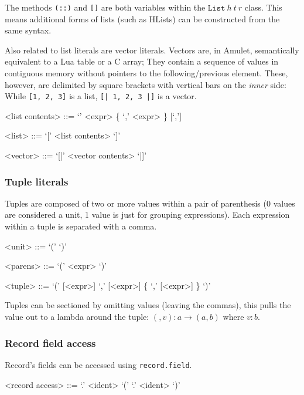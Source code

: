 The methods \texttt{(::)} and \texttt{[]} are both variables within the $\mathtt{List}\ h\ t\ r$ class. This means additional forms of lists (such as HLists) can be constructed from the same syntax.

Also related to list literals are vector literals. Vectors are, in Amulet, semantically equivalent to a Lua table or a C array; They contain a sequence of values in contiguous memory without pointers to the following/previous element. These, however, are delimited by square brackets with vertical bars on the \textit{inner} side: While \texttt{[1, 2, 3]} is a list, \texttt{[| 1, 2, 3 |]} is a vector.

\begin{grammar}
<list contents> ::= `'
               \alt <expr> \{ `,' <expr> \} [`,']

<list> ::= `[' <list contents> `]'

<vector> ::= `[|' <vector contents> `|]'
\end{grammar}

\subsubsection{Tuple literals}
Tuples are composed of two or more values within a pair of parenthesis (0 values are considered a unit, 1 value is just for grouping expressions). Each expression within a tuple is separated with a comma.

\begin{grammar}
<unit>   ::= `(' `)'

<parens> ::= `(' <expr> `)'

<tuple>  ::= `(' [<expr>] `,' [<expr>] \{ `,' [<expr>] \} `)'
\end{grammar}

Tuples can be sectioned by omitting values (leaving the commas), this pulls the value out to a lambda around the tuple: $(, v) : a \to (a, b)$ where $v : b$.

\subsubsection{Record field access}
Record's fields can be accessed using \texttt{record.field}.

\begin{grammar}
<record access> ::= `.' <ident>
               \alt `(' `.' <ident> `)'
\end{grammar}

